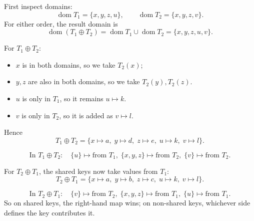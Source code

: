 \documentclass{article}
\newcommand{\dom}{\operatorname{dom}}
\begin{document}
First inspect domains:
\[
  \dom T_1 = \{x,y,z,u\}, \qquad \dom T_2 = \{x,y,z,v\}.
\]
For either order, the result domain is
\[
  \dom(T_1 \oplus T_2) = \dom T_1 \cup \dom T_2 = \{x,y,z,u,v\}.
\]

For $T_1 \oplus T_2$:
\begin{itemize}
  \item $x$ is in both domains, so we take $T_2(x)$;
  \item $y,z$ are also in both domains, so we take $T_2(y),T_2(z)$.
  \item $u$ is only in $T_1$, so it remains $u \mapsto k$.
  \item $v$ is only in $T_2$, so it is added as $v \mapsto l$.
\end{itemize}
Hence
\[
  T_1 \oplus T_2
  = \{ x \mapsto a,\; y \mapsto d,\; z \mapsto e,\; u \mapsto k,\; v \mapsto l \}.
\]
\begin{center}
\end{center}
\[
  \text{In } T_1 \oplus T_2:\quad
  \{u\}\mapsto \text{from }T_1,\;
  \{x,y,z\}\mapsto \text{from }T_2,\;
  \{v\}\mapsto \text{from }T_2.
\]

For $T_2 \oplus T_1$, the shared keys now take values from $T_1$:
\[
  T_2 \oplus T_1
  = \{ x \mapsto a,\; y \mapsto b,\; z \mapsto c,\; u \mapsto k,\; v \mapsto l \}.
\]
\begin{center}
\end{center}
\[
  \text{In } T_2 \oplus T_1:\quad
  \{v\}\mapsto \text{from }T_2,\;
  \{x,y,z\}\mapsto \text{from }T_1,\;
  \{u\}\mapsto \text{from }T_1.
\]
So on shared keys, the right-hand map wins; on non-shared keys, whichever side defines the key contributes it.
\end{document}
